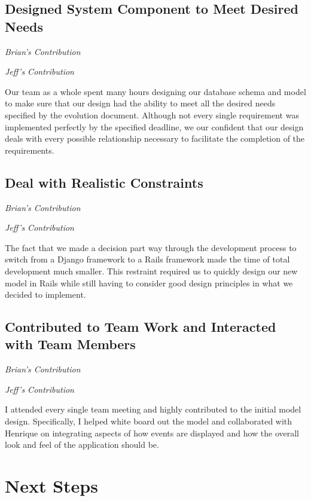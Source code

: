 \documentclass[11pt]{article}
\begin{document}
\subsection{Designed System Component to Meet Desired Needs}

\textit{Brian's Contribution}



\textit{Jeff's Contribution}

Our team as a whole spent many hours designing our database schema and model to make sure that our design had the ability to meet all the desired needs specified by the evolution document.  Although not every single requirement was implemented perfectly by the specified deadline, we our confident that our design deals with every possible relationship necessary to facilitate the completion of the requirements.

\subsection{Deal with Realistic Constraints}

\textit{Brian's Contribution}



\textit{Jeff's Contribution}

The fact that we made a decision part way through the development process to switch from a Django framework to a Rails framework made the time of total development much smaller.  This restraint required us to quickly design our new model in Rails while still having to consider good design principles in what we decided to implement.

\subsection{Contributed to Team Work and Interacted with Team Members}

\textit{Brian's Contribution}

\textit{Jeff's Contribution}

I attended every single team meeting and highly contributed to the initial model design.  Specifically, I helped white board out the model and collaborated with Henrique on integrating aspects of how events are displayed and how the overall look and feel of the application should be.

\section{Next Steps}
\end{document}
